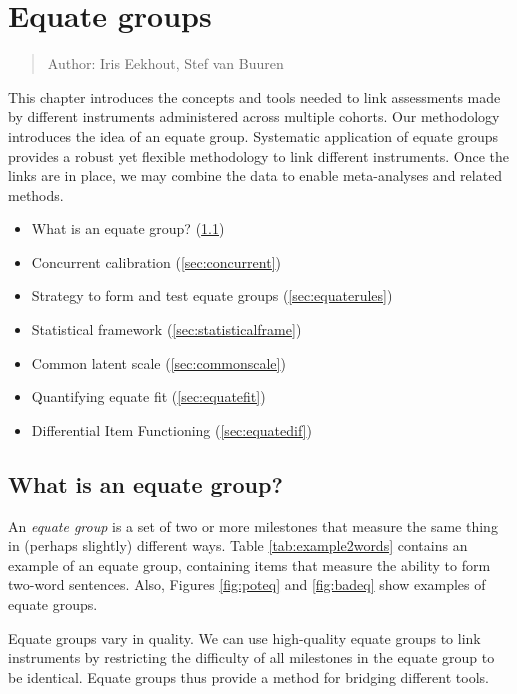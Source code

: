 \documentclass[
]{book}
\providecommand{\tightlist}{%
  \setlength{\itemsep}{0pt}\setlength{\parskip}{0pt}}
\begin{document}
\hypertarget{ch:equategroups}{%
\chapter{Equate groups}\label{ch:equategroups}}

\begin{quote}
Author: Iris Eekhout, Stef van Buuren
\end{quote}

This chapter introduces the concepts and tools needed to link assessments made by different instruments administered across multiple cohorts. Our methodology introduces the idea of an equate group. Systematic application of equate groups provides a robust yet flexible methodology to link different instruments. Once the links are in place, we may combine the data to enable meta-analyses and related methods.

\begin{itemize}
\tightlist
\item
  What is an equate group? (\ref{sec:eqdef})
\item
  Concurrent calibration (\ref{sec:concurrent})
\item
  Strategy to form and test equate groups (\ref{sec:equaterules})
\item
  Statistical framework (\ref{sec:statisticalframe})
\item
  Common latent scale (\ref{sec:commonscale})
\item
  Quantifying equate fit (\ref{sec:equatefit})
\item
  Differential Item Functioning (\ref{sec:equatedif})
\end{itemize}

\hypertarget{sec:eqdef}{%
\section{What is an equate group?}\label{sec:eqdef}}

An \emph{equate group} is a set of two or more milestones that measure the same thing in (perhaps slightly) different ways. Table \ref{tab:example2words} contains an example of an equate group, containing items that measure the ability to form two-word sentences. Also, Figures \ref{fig:poteq} and \ref{fig:badeq} show examples of equate groups.

Equate groups vary in quality. We can use high-quality equate groups to link instruments by restricting the difficulty of all milestones in the equate group to be identical. Equate groups thus provide a method for bridging different tools.
\end{document}
